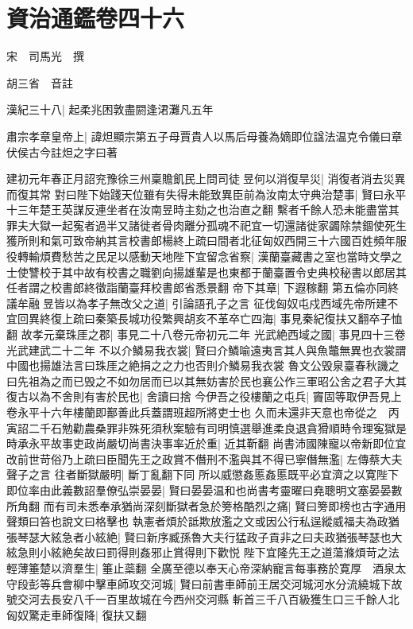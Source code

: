 \chapter{資治通鑑卷四十六}
宋　司馬光　撰

胡三省　音註

漢紀三十八|{
	起柔兆困敦盡閼逢涒灘凡五年}


肅宗孝章皇帝上|{
	諱炟顯宗第五子母賈貴人以馬后母養為嫡即位諡法温克令儀曰章伏侯古今註炟之字曰著}


建初元年春正月詔兖豫徐三州稟贍飢民上問司徒昱何以消復旱災|{
	消復者消去災異而復其常}
對曰陛下始踐天位雖有失得未能致異臣前為汝南太守典治楚事|{
	賢曰永平十三年楚王英謀反連坐者在汝南昱時主劾之也治直之翻}
繫者千餘人恐未能盡當其罪夫大獄一起寃者過半又諸徙者骨肉離分孤魂不祀宜一切還諸徙家蠲除禁錮使死生獲所則和氣可致帝納其言校書郎楊終上疏曰間者北征匈奴西開三十六國百姓頻年服役轉輸煩費愁苦之民足以感動天地陛下宜留念省察|{
	漢蘭臺藏書之室也當時文學之士使讐校于其中故有校書之職劉向揚雄輩是也東都于蘭臺置令史典校秘書以郎居其任者謂之校書郎終徵詣蘭臺拜校書郎省悉景翻}
帝下其章|{
	下遐稼翻}
第五倫亦同終議牟融昱皆以為孝子無改父之道|{
	引論語孔子之言}
征伐匈奴屯戍西域先帝所建不宜回異終復上疏曰秦築長城功役繁興胡亥不革卒亡四海|{
	事見秦紀復扶又翻卒子恤翻}
故孝元棄珠厓之郡|{
	事見二十八卷元帝初元二年}
光武絶西域之國|{
	事見四十三卷光武建武二十二年}
不以介鱗易我衣裳|{
	賢曰介鱗喻遠夷言其人與魚鼈無異也衣裳謂中國也揚雄法言曰珠厓之絶捐之之力也否則介鱗易我衣裳}
魯文公毁泉臺春秋譏之曰先祖為之而已毁之不如勿居而已以其無妨害於民也襄公作三軍昭公舍之君子大其復古以為不舍則有害於民也|{
	舍讀曰捨}
今伊吾之役樓蘭之屯兵|{
	竇固等取伊吾見上卷永平十六年樓蘭即鄯善此兵蓋謂班超所將吏士也}
久而未還非天意也帝從之　丙寅詔二千石勉勸農桑罪非殊死須秋案驗有司明慎選舉進柔良退貪猾順時令理寃獄是時承永平故事吏政尚嚴切尚書決事率近於重|{
	近其靳翻}
尚書沛國陳寵以帝新即位宜改前世苛俗乃上疏曰臣聞先王之政賞不僭刑不濫與其不得已寧僭無濫|{
	左傳蔡大夫聲子之言}
往者斷獄嚴明|{
	斷丁亂翻下同}
所以威懲姦慝姦慝既平必宜濟之以寛陛下即位率由此義數詔羣僚弘崇晏晏|{
	賢曰晏晏温和也尚書考靈曜曰堯聰明文塞晏晏數所角翻}
而有司未悉奉承猶尚深刻斷獄者急於篣格酷烈之痛|{
	賢曰篣即榜也古字通用聲類曰笞也說文曰格擊也}
執憲者煩於詆欺放濫之文或因公行私逞縱威福夫為政猶張琴瑟大絃急者小絃絶|{
	賢曰新序臧孫魯大夫行猛政子貢非之曰夫政猶張琴瑟也大絃急則小絃絶矣故曰罰得則姦邪止賞得則下歡悦}
陛下宜隆先王之道蕩滌煩苛之法輕薄箠楚以濟羣生|{
	箠止蘂翻}
全廣至德以奉天心帝深納寵言每事務於寛厚　酒泉太守段彭等兵會柳中擊車師攻交河城|{
	賢曰前書車師前王居交河城河水分流繞城下故號交河去長安八千一百里故城在今西州交河縣}
斬首三千八百級獲生口三千餘人北匈奴驚走車師復降|{
	復扶又翻}
